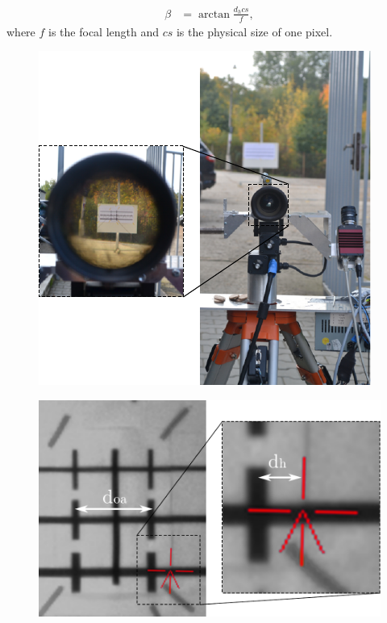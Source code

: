 \begin{equation}
\begin{aligned}
\beta &= \arctan\frac{d_{h}cs}{f},
\end{aligned}
\end{equation}
where $f$ is the focal length and $cs$ is the physical size of one pixel.

\begin{figure}[htb]
	\centering
	\begin{minipage}{.37\textwidth}
		\centering
		\includegraphics[width=.99\linewidth]{fig/rect_telescope.pdf}
		\label{fig:rect_telescope}
	\end{minipage}
	\hfill
	\begin{minipage}{.59\textwidth}
		\centering
		\includegraphics[width=.99\linewidth]{fig/rect_azi_axis.pdf}

\end{minipage}
\end{figure}
